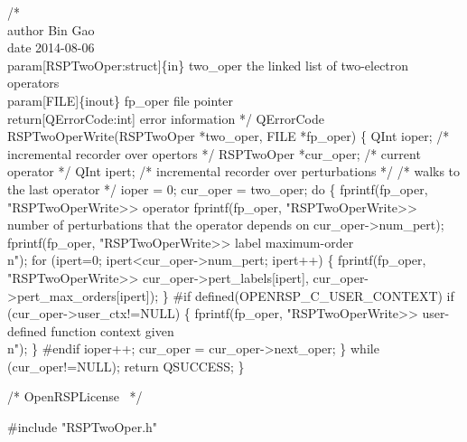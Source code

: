 /*%
    \\author Bin Gao
    \\date 2014-08-06
    \\param[RSPTwoOper:struct]\{in\} two_oper the linked list of two-electron operators
    \\param[FILE]\{inout\} fp_oper file pointer
    \\return[QErrorCode:int] error information
*/
QErrorCode RSPTwoOperWrite(RSPTwoOper *two_oper, FILE *fp_oper)
\{
    QInt ioper;            /* incremental recorder over opertors */
    RSPTwoOper *cur_oper;  /* current operator */
    QInt ipert;            /* incremental recorder over perturbations */
    /* walks to the last operator */
    ioper = 0;
    cur_oper = two_oper;
    do \{
        fprintf(fp_oper, "RSPTwoOperWrite>> operator %
        fprintf(fp_oper,
                "RSPTwoOperWrite>> number of perturbations that the operator depends on %
                cur_oper->num_pert);
        fprintf(fp_oper, "RSPTwoOperWrite>> label           maximum-order\\n");
        for (ipert=0; ipert<cur_oper->num_pert; ipert++) \{
            fprintf(fp_oper,
                    "RSPTwoOperWrite>>       %
                    cur_oper->pert_labels[ipert],
                    cur_oper->pert_max_orders[ipert]);
        \}
#if defined(OPENRSP_C_USER_CONTEXT)
        if (cur_oper->user_ctx!=NULL) \{
            fprintf(fp_oper, "RSPTwoOperWrite>> user-defined function context given\\n");
        \}
#endif
        ioper++;
        cur_oper = cur_oper->next_oper;
    \} while (cur_oper!=NULL);
    return QSUCCESS;
\}

\nwendcode{}\endmoddef
/*
  \LA{}OpenRSPLicense~{\nwtagstyle{}}\RA{}
*/

#include "RSPTwoOper.h"


